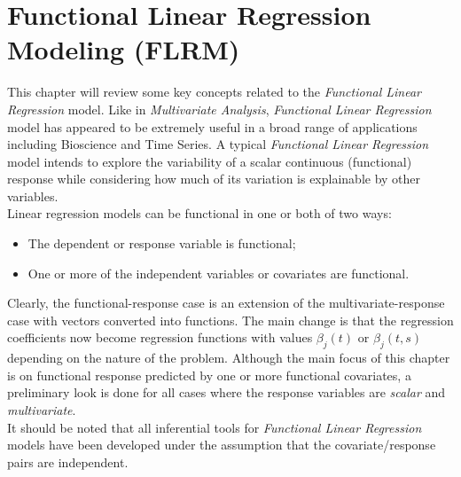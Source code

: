 
\chapter{Functional Linear Regression Modeling (FLRM)} %

\label{Chapter4} %



This chapter will review some key concepts related to the \textit{Functional Linear Regression} model. Like in \textit{Multivariate Analysis}, \textit{Functional Linear Regression} model has appeared to be extremely useful in a broad range of applications including Bioscience and Time Series. A typical \textit{Functional Linear Regression} model intends to explore the variability of a scalar continuous (functional) response while considering how much of its variation is explainable by other variables.\\
Linear regression models can be functional in one or both of two ways:
\begin{itemize}
\item The dependent or response variable is functional;
\item One or more of the independent variables or covariates are functional.
\end{itemize}
Clearly, the functional-response case is an extension of the multivariate-response case with vectors converted into functions. The main change is that the regression coefficients now become regression functions with values $\beta_j(t)$ or $\beta_j(t,s)$ depending on the nature of the problem. Although the main focus of this chapter is on functional response predicted by one or more functional covariates, a preliminary look is done for all cases where the response variables are \textit{scalar} and \textit{multivariate}.\\ It should be noted that all inferential tools for \textit{Functional Linear Regression} models have been developed under the assumption that the covariate/response pairs are independent. 
\clearpage

